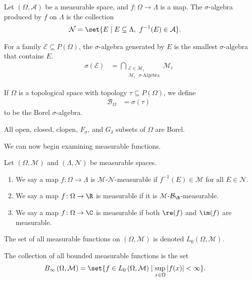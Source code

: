 \begin{definition}
Let $\left(\Omega,\mathcal{A}\right)$ be a measurable space, and $f\colon \Omega\rightarrow \Lambda$ is a map. The $\sigma$-algebra produced by $f$ on $\Lambda$ is the collection
\begin{align*}
  \mathcal{N} &= \set{E\mid E\subseteq \Lambda,~f^{-1}(E) \in \mathcal{A}}.
\end{align*}

\end{definition}

\begin{definition}
  For a family $\mathcal{E}\subseteq P\left(\Omega\right)$, the $\sigma$-algebra generated by $E$ is the smallest $\sigma$-algebra that contains $E$.
  \begin{align*}
    \sigma\left(\mathcal{E}\right) &= \bigcap_{\substack{\mathcal{E}\in \mathcal{M}_i \\ \text{$\mathcal{M}_i$ $\sigma$-Algebra}}} \mathcal{M}_i
  \end{align*}
\end{definition}
\begin{definition}
  If $\Omega$ is a topological space with topology $\tau\subseteq P(\Omega)$, we define
  \begin{align*}
    \mathcal{B}_{\Omega} &= \sigma\left(\tau\right)
  \end{align*}
  to be the Borel $\sigma$-algebra.
\end{definition}
All open, closed, clopen, $F_{\sigma}$, and $G_{\delta}$ subsets of $\Omega$ are Borel.\break

We can now begin examining measurable functions.
\begin{definition}
  Let $\left(\Omega,\mathcal{M}\right)$ and $\left(\Lambda,\mathcal{N}\right)$ be measurable spaces.
  \begin{enumerate}[(1)]
    \item We say a map $f\colon \Omega\rightarrow \Lambda$ is $\mathcal{M}$-$\mathcal{N}$-measurable if $f^{-1}\left(E\right)\in \mathcal{M}$ for all $E\in \mathcal{N}$.
    \item We say a map $f\colon \Omega\rightarrow \R$ is measurable if it is $\mathcal{M}$-$\mathcal{B}_{\R}$-measurable.
    \item We say a map $f\colon \Omega\rightarrow \C$ is measurable if both $\re(f)$ and $\im(f)$ are measurable.
  \end{enumerate}
  The set of all measurable functions on $\left(\Omega,\mathcal{M}\right)$ is denoted $L_{0}\left(\Omega,\mathcal{M}\right)$.\newline

  The collection of all bounded measurable functions is the set
  \begin{align*}
    B_{\infty}\left(\Omega,\mathcal{M}\right) &= \set{f\in L_0\left(\Omega,\mathcal{M}\right)\mid \sup_{x\in\Omega}\left\vert f(x) \right\vert < \infty}.
  \end{align*}
\end{definition}

